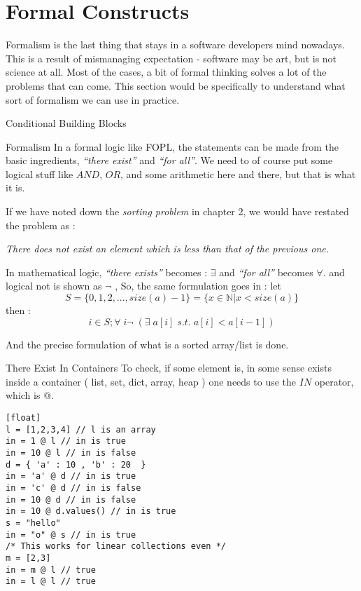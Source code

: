 \chapter{Formal Constructs}\label{using-predicates}

{\LARGE F}ormalism is the last thing that stays in a software developers mind nowadays. This is a result of mismanaging expectation - software may be art, but is not science at all. Most of the cases, a bit of formal thinking solves a lot of the problems that can come.
This section would be specifically to understand what sort of formalism we can use in practice.

\begin{section}{Conditional Building Blocks}

\begin{subsection}{Formalism}
In a formal logic like FOPL, the statements can be made from the basic ingredients, 
\emph{``there exist''} and \emph{``for all''}. We need to of course put some logical stuff like $AND$, $OR$,
and some arithmetic here and there, but that is what it is.

If we have noted down the \emph{sorting problem} in chapter 2, we would have restated the problem as :

\begin{center}
\emph{ There does not exist an element which is less than that of the previous one. }
\end{center} 

In mathematical logic, \emph{``there exists''} becomes : $\exists$ and \emph{``for all''} becomes $\forall$.
and logical not is shown as $\neg$ ,  So, the same formulation goes in : let 
$$
S = \{ 0, 1, 2, ... , size(a)-1  \} =  \{  x \in \mathbb{N} | x < size(a) \} 
$$
then :
$$
  i \in S ; \forall \; i  \neg \; ( \exists \; a[i] \; s.t. \; a[i] < a[i-1]    ) 
$$ 

And the precise formulation of what is a sorted array/list is done.

\end{subsection}


\begin{subsection}{There Exist In Containers}
To check, if some element is, in some sense exists inside a container ( list, set, dict, array, heap )
one needs to use the $IN$ operator, which is $@$. 

\begin{lstlisting}[style=JexlStyle][float]
l = [1,2,3,4] // l is an array 
in = 1 @ l // in is true 
in = 10 @ l // in is false 
d = { 'a' : 10 , 'b' : 20  }
in = 'a' @ d // in is true 
in = 'c' @ d // in is false 
in = 10 @ d // in is false 
in = 10 @ d.values() // in is true 
s = "hello"
in = "o" @ s // in is true 
/* This works for linear collections even */
m = [2,3]
in = m @ l // true 
in = l @ l // true  
\end{lstlisting}


\end{subsection}
\end{section}
